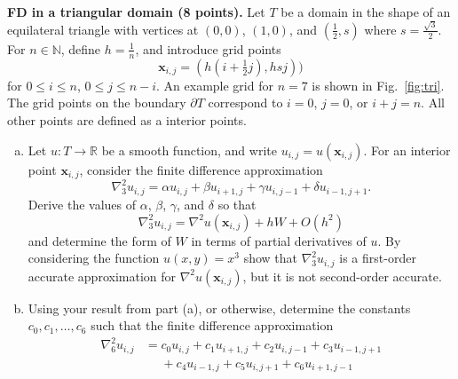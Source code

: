 \documentclass{article}
\def\R{{\mathbb R}}
\def\N{{\mathbb N}}
\newcommand{\p}{\partial}
\renewcommand{\vec}[1]{\mathbf{#1}}
\newcommand{\vx}{\vec{x}}
\begin{document}
\begin{problem} \\ 
  \textbf{FD in a triangular domain (8 points).}
        Let $T$ be a domain in the shape of an equilateral triangle with vertices
        at $(0,0)$, $(1,0)$, and $(\tfrac12,s)$ where $s=\tfrac{\sqrt{3}}{2}$. For $n \in \N$,
        define $h=\tfrac{1}{n}$, and introduce grid points
        \begin{equation}
          \vx_{i,j} = (h(i+\tfrac12 j), hsj))
        \end{equation}
        for $0\le i\le n$, $0\le j \le n-i$. An example grid for $n=7$ is shown in
        Fig.~\ref{fig:tri}. The grid points on the boundary $\p T$ correspond to
        $i=0$, $j=0$, or $i+j=n$. All other points are defined as a interior points.
        \begin{enumerate}[(a)]
          \item Let $u: T \to \R$ be a smooth function, and write $u_{i,j} =
                  u(\vx_{i,j})$. For an interior point $\vx_{i,j}$, consider the finite
                difference approximation
                \begin{equation}
                  \nabla^2_3u_{i,j} = \alpha u_{i,j} + \beta u_{i+1,j} + \gamma u_{i,j-1} + \delta u_{i-1,j+1}. \label{eq:lap1}
                \end{equation}
                Derive the values of $\alpha$, $\beta$, $\gamma$, and $\delta$ so that
                \begin{equation}
                  \nabla^2_3u_{i,j} = \nabla^2 u (\vx_{i,j}) + h W + O(h^2)
                \end{equation}
                and determine the form of $W$ in terms of partial derivatives of $u$.
                By considering the function $u(x,y)=x^3$ show that $\nabla^2_3 u_{i,j}$
                is a first-order accurate approximation for $\nabla^2 u(\vx_{i,j})$,
                but it is not second-order accurate.
          \item Using your result from part (a), or otherwise, determine
                the constants $c_0,c_1,\ldots, c_6$ such that the finite difference
                approximation
                \begin{align}
                  \nabla^2_6u_{i,j} & = c_0 u_{i,j} + c_1 u_{i+1,j} + c_2 u_{i,j-1} + c_3 u_{i-1,j+1} \nonumber   \\
                                    & \phantom{=}+c_4 u_{i-1,j} + c_5 u_{i,j+1} + c_6 u_{i+1,j-1} \label{eq:lap2}
                \end{align}

\end{enumerate}
\end{problem}
\end{document}
